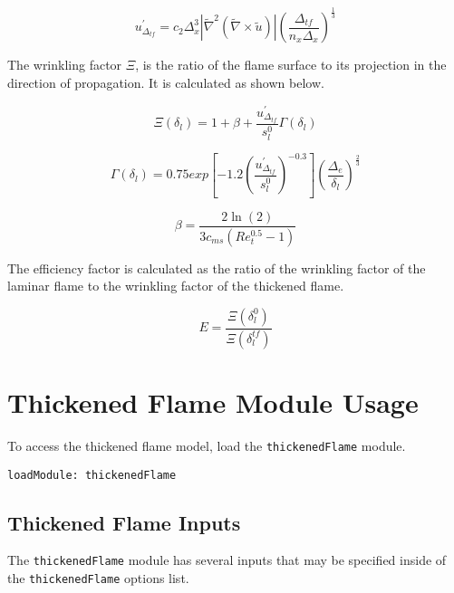 \documentclass{article}
\begin{document}
\begin{equation}
u^{\prime}_{\Delta_{tf}} = c_2 \Delta^3_x \left| \tilde{\nabla}^{2} \left( \tilde{\nabla} \times \tilde{u} \right) \right| {\left( \frac{\Delta_{tf}}{n_x \Delta_x} \right)}^{\frac{1}{3}}
\end{equation}

The wrinkling factor {\tt $\Xi$}, is the ratio of the flame surface to its projection in the direction of propagation. It is calculated as shown below.

\begin{equation}
\Xi \left( \delta_l \right) = 1 + \beta + \frac{u^{\prime}_{\Delta_{tf}}}{s^0_l} \Gamma \left( \delta_l \right)
\end{equation}

\begin{equation}
\Gamma \left( \delta_l \right) = 0.75 exp \left[ -1.2 {\left( \frac{u^{\prime}_{\Delta_{tf}}}{s^0_l} \right)}^{-0.3} \right] {\left( \frac{\Delta_e}{\delta_l} \right)}^{\frac{2}{3}}
\end{equation}

\begin{equation}
\beta = \frac{2 \ln \left( 2 \right)}{3 c_{ms} \left( Re^{0.5}_{t} - 1\right)}
\end{equation}

The efficiency factor is calculated as the ratio of the wrinkling factor of the laminar flame to the wrinkling factor of the thickened flame.

\begin{equation}
E = \frac{\Xi \left( \delta^0_l \right)}{\Xi \left( \delta^{tf}_l \right)}
\end{equation}

\section{Thickened Flame Module Usage}

To access the thickened flame model, load the {\tt thickenedFlame} module.

\begin{verbatim}
loadModule: thickenedFlame
\end{verbatim}

\subsection{Thickened Flame Inputs}

The {\tt thickenedFlame} module has several inputs that may be specified inside of the {\tt thickenedFlame} options list.
\end{document}
